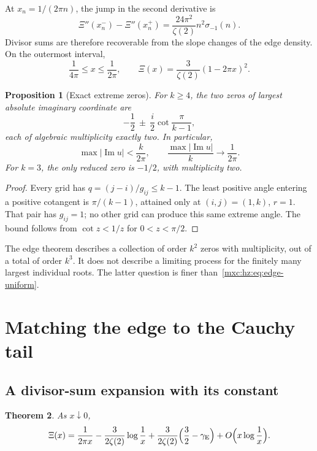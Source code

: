 \documentclass[11pt]{article}
\numberwithin{equation}{section}
\newtheorem{theorem}{Theorem}[section]
\newtheorem{proposition}[theorem]{Proposition}
\theoremstyle{definition}
\theoremstyle{remark}
\newcommand{\gE}{\gamma_{\mathrm E}}
\begin{document}
At $x_n=1/(2\pi n)$, the jump in the second derivative is
\begin{equation}\label{mxc:hz:eq:edge-jump}
 \Xi''(x_n^-)-\Xi''(x_n^+)=\frac{24\pi^2}{\zeta(2)}n^2\sigma_{-1}(n).
\end{equation}
Divisor sums are therefore recoverable from the slope changes of the edge
density. On the outermost interval,
\[
 \frac1{4\pi}\le x\le\frac1{2\pi},
 \qquad
 \Xi(x)=\frac3{\zeta(2)}(1-2\pi x)^2.
\]

\begin{proposition}[Exact extreme zeros]\label{mxc:hz:prop:extreme}
For $k\ge4$, the two zeros of largest absolute imaginary coordinate are
\begin{equation}\label{mxc:hz:eq:extreme}
 -\frac12\ \pm\ \frac{i}{2}\cot\frac{\pi}{k-1},
\end{equation}
each of algebraic multiplicity exactly two. In particular,
\[
 \max|\operatorname{Im}u|<\frac{k}{2\pi},\qquad
 \frac{\max|\operatorname{Im}u|}{k}\longrightarrow\frac1{2\pi}.
\]
For $k=3$, the only reduced zero is $-1/2$, with multiplicity two.
\end{proposition}

\begin{proof}
Every grid has $q=(j-i)/g_{ij}\le k-1$. The least positive angle entering a
positive cotangent is $\pi/(k-1)$, attained only at $(i,j)=(1,k)$, $r=1$.
That pair has $g_{ij}=1$; no other grid can produce this same extreme
angle. The bound follows from $\cot z<1/z$ for $0<z<\pi/2$.
\end{proof}

The edge theorem describes a collection of order $k^2$ zeros with
multiplicity, out of a total of order $k^3$. It does not describe a
limiting process for the finitely many largest individual roots. The
latter question is finer than~\eqref{mxc:hz:eq:edge-uniform}.

\section{Matching the edge to the Cauchy tail}\label{mxc:hz:sec:matching}

\subsection{A divisor-sum expansion with its constant}

\begin{theorem}\label{mxc:hz:thm:edge-small}
As $x\downarrow0$,
\begin{equation}\label{mxc:hz:eq:edge-small}
 \Xi(x)=\frac1{2\pi x}
 -\frac3{2\zeta(2)}\log\frac1x
 +\frac3{2\zeta(2)}\Bigl(\frac32-\gE\Bigr)
 +O\Bigl(x\log\frac1x\Bigr).
\end{equation}
\end{theorem}
\end{document}
